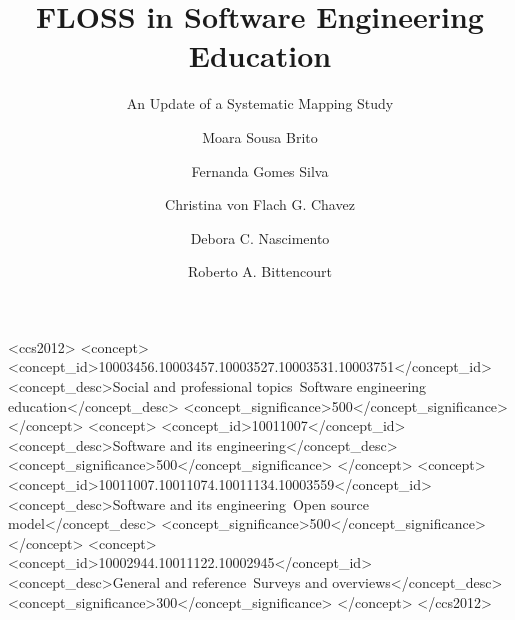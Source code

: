 \documentclass[sigconf]{acmart}
\begin{document}
\title{FLOSS in Software Engineering Education}
\subtitle{An Update of a Systematic Mapping Study}

\author{Moara Sousa Brito}

\author{Fernanda Gomes Silva}

\author{Christina von Flach G. Chavez} 

\author{Debora C. Nascimento} 

\author{Roberto A. Bittencourt} 


\renewcommand{\shortauthors}{M. Brito et al.}

\begin{abstract}

\end{abstract}

%
%
\begin{CCSXML}
<ccs2012>
<concept>
<concept_id>10003456.10003457.10003527.10003531.10003751</concept_id>
<concept_desc>Social and professional topics~Software engineering education</concept_desc>
<concept_significance>500</concept_significance>
</concept>
<concept>
<concept_id>10011007</concept_id>
<concept_desc>Software and its engineering</concept_desc>
<concept_significance>500</concept_significance>
</concept>
<concept>
<concept_id>10011007.10011074.10011134.10003559</concept_id>
<concept_desc>Software and its engineering~Open source model</concept_desc>
<concept_significance>500</concept_significance>
</concept>
<concept>
<concept_id>10002944.10011122.10002945</concept_id>
<concept_desc>General and reference~Surveys and overviews</concept_desc>
<concept_significance>300</concept_significance>
</concept>
</ccs2012>
\end{CCSXML}

\end{document}
